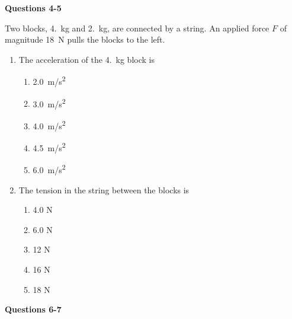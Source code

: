 \documentclass{../../oss-apphys}
\begin{document}
\begin{multicols}{2}
  \textbf{Questions 4-5}

  Two blocks, \SI{4.}{\kilo\gram} and \SI{2.}{\kilo\gram}, are connected by a
  string. An applied force $F$ of magnitude \SI{18}{\newton} pulls the blocks
  to the left.
  \begin{center}
  \end{center}
  
  \begin{enumerate}[resume,leftmargin=18pt]
    
  \item The acceleration of the \SI{4.}{\kilo\gram} block is
    \begin{enumerate}[noitemsep,topsep=0pt,leftmargin=18pt,label=(\Alph*)]
    \item\SI{2.0}{m/s^2}
    \item\SI{3.0}{m/s^2}
    \item\SI{4.0}{m/s^2}
    \item\SI{4.5}{m/s^2}
    \item\SI{6.0}{m/s^2}
    \end{enumerate}

  \item The tension in the string between the blocks is
    \begin{enumerate}[noitemsep,topsep=0pt,leftmargin=18pt,label=(\Alph*)]
    \item 4.0 N
    \item 6.0 N
    \item 12 N
    \item 16 N
    \item 18 N
    \end{enumerate}
  \end{enumerate}
  \columnbreak
  
  \textbf{Questions 6-7}


\end{multicols}
\end{document}

